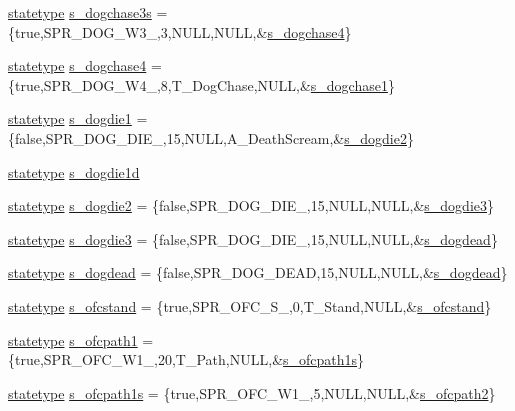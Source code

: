 \begin{DoxyCompactItemize}
\item 
\hyperlink{structstatestruct}{statetype} \hyperlink{WL__ACT2_8C_a1d7285618b28c1fc7a6bebed630f9907}{s\_\-dogchase3s} = \{true,SPR\_\-DOG\_\-W3\_,3,NULL,NULL,\&\hyperlink{WL__ACT2_8C_a2c20549f02ea25ec68a58330a4ded3ce}{s\_\-dogchase4}\}
\item 
\hyperlink{structstatestruct}{statetype} \hyperlink{WL__ACT2_8C_a2c20549f02ea25ec68a58330a4ded3ce}{s\_\-dogchase4} = \{true,SPR\_\-DOG\_\-W4\_,8,T\_\-DogChase,NULL,\&\hyperlink{WL__DEF_8H_a50a4f7d61d6b2fe4fb9a477b1ac624e7}{s\_\-dogchase1}\}
\item 
\hyperlink{structstatestruct}{statetype} \hyperlink{WL__ACT2_8C_a194d846647c57b650ec0478566bac165}{s\_\-dogdie1} = \{false,SPR\_\-DOG\_\-DIE\_,15,NULL,A\_\-DeathScream,\&\hyperlink{WL__ACT2_8C_a09233ca3c171ae36f986db31e03e6609}{s\_\-dogdie2}\}
\item 
\hyperlink{structstatestruct}{statetype} \hyperlink{WL__ACT2_8C_a01165014bbb7e6d787a34045aa9fa32f}{s\_\-dogdie1d}
\item 
\hyperlink{structstatestruct}{statetype} \hyperlink{WL__ACT2_8C_a09233ca3c171ae36f986db31e03e6609}{s\_\-dogdie2} = \{false,SPR\_\-DOG\_\-DIE\_,15,NULL,NULL,\&\hyperlink{WL__ACT2_8C_a8fdecc366ad38c39f6150272f4f80ee7}{s\_\-dogdie3}\}
\item 
\hyperlink{structstatestruct}{statetype} \hyperlink{WL__ACT2_8C_a8fdecc366ad38c39f6150272f4f80ee7}{s\_\-dogdie3} = \{false,SPR\_\-DOG\_\-DIE\_,15,NULL,NULL,\&\hyperlink{WL__ACT2_8C_ac1b4097b612709874970b7dbcf98d237}{s\_\-dogdead}\}
\item 
\hyperlink{structstatestruct}{statetype} \hyperlink{WL__ACT2_8C_ac1b4097b612709874970b7dbcf98d237}{s\_\-dogdead} = \{false,SPR\_\-DOG\_\-DEAD,15,NULL,NULL,\&\hyperlink{WL__ACT2_8C_ac1b4097b612709874970b7dbcf98d237}{s\_\-dogdead}\}
\item 
\hyperlink{structstatestruct}{statetype} \hyperlink{WL__ACT2_8C_a33164690fc87cff9f140cb3dc68dd477}{s\_\-ofcstand} = \{true,SPR\_\-OFC\_\-S\_,0,T\_\-Stand,NULL,\&\hyperlink{WL__ACT2_8C_a33164690fc87cff9f140cb3dc68dd477}{s\_\-ofcstand}\}
\item 
\hyperlink{structstatestruct}{statetype} \hyperlink{WL__ACT2_8C_a29992c9719ce8a66a95f69e0833eeb07}{s\_\-ofcpath1} = \{true,SPR\_\-OFC\_\-W1\_,20,T\_\-Path,NULL,\&\hyperlink{WL__ACT2_8C_a6fb294b7e1de7d6d5a785903fce9952d}{s\_\-ofcpath1s}\}
\item 
\hyperlink{structstatestruct}{statetype} \hyperlink{WL__ACT2_8C_a6fb294b7e1de7d6d5a785903fce9952d}{s\_\-ofcpath1s} = \{true,SPR\_\-OFC\_\-W1\_,5,NULL,NULL,\&\hyperlink{WL__ACT2_8C_a90e98fd84e585f813ddd1a343605cacc}{s\_\-ofcpath2}\}

\end{DoxyCompactItemize}
